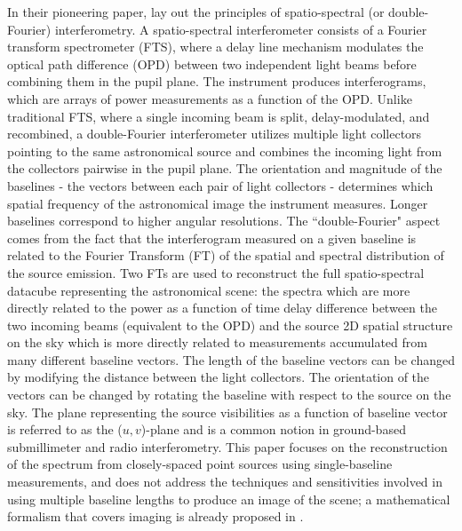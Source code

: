 In their pioneering paper, \citet{Mariotti:1988vea} lay out the principles of spatio-spectral 
(or double-Fourier) interferometry. A spatio-spectral interferometer consists of a Fourier transform 
spectrometer (FTS), where a delay line mechanism modulates the optical path difference (OPD) between two independent light beams before combining them in the pupil plane. The instrument produces interferograms, which are arrays of power measurements as a function of the OPD. Unlike traditional FTS, 
where a single incoming beam is split, delay-modulated, and recombined, a double-Fourier 
interferometer utilizes multiple light collectors pointing to the same astronomical source and 
combines the incoming light from the collectors pairwise in the pupil plane. The orientation 
and magnitude of the baselines - the vectors between each pair of light collectors - determines 
which  spatial frequency of the astronomical image the instrument measures. 
Longer baselines correspond to higher angular resolutions. The ``double-Fourier" aspect comes from 
the fact that the interferogram measured on a given baseline is related to the Fourier Transform (FT)
of the spatial and spectral distribution of the source emission.
Two FTs are used to reconstruct the full spatio-spectral datacube representing the 
astronomical scene: the spectra which are more directly related to the power as a function of time
delay difference between the two incoming beams (equivalent to the OPD) and
the source 2D spatial structure on the sky which is more directly related to measurements
accumulated from many different baseline vectors. The length of the baseline vectors can be changed by modifying the distance between the light collectors. The orientation of the vectors can be changed by rotating the baseline with respect to the source on the sky.
The plane representing the source visibilities
as a function of baseline vector is referred to as the ($u, v$)-plane and is a common notion in ground-based submillimeter and radio interferometry. This paper focuses on the reconstruction of the spectrum from closely-spaced point sources using single-baseline measurements, and does not address the techniques and sensitivities involved in using multiple baseline lengths to produce an image of the scene; a mathematical formalism that covers imaging is already proposed in \citet{Elias:2007jsa}.


